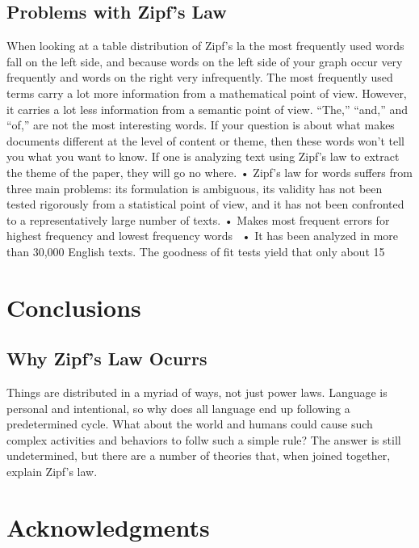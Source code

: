 \documentclass[a4paper,10pt]{article}
\begin{document}
\subsection{Problems with Zipf's Law}

When looking at a table distribution of Zipf’s la the most frequently used words fall on the left side, and because words on the left side of your graph occur very frequently and words on the right very infrequently. The most frequently used terms carry a lot more information from a mathematical point of view. However, it carries a lot less information from a semantic point of view. “The,” “and,” and “of,” are not the most interesting words. If your question is about what makes documents different at the level of content or theme, then these words won’t tell you what you want to know. If one is analyzing text using Zipf’s law to extract the theme of the paper, they will go no where. 
• Zipf's law for words suffers from three main problems: its formulation is ambiguous, its validity has not been tested rigorously from a statistical point of view, and it has not been confronted to a representatively large number of texts.
• Makes most frequent errors for highest frequency and lowest frequency words 
• It has been analyzed in more than 30,000 English texts. The goodness of fit tests yield that only about 15%


\section{Conclusions}


\subsection{Why Zipf's Law Ocurrs}

Things are distributed in a myriad of ways, not just power laws. Language is personal and intentional, so why does all language end up following a predetermined cycle. What about the world and humans could cause such complex activities and behaviors to follw such a simple rule? The answer is still undetermined, but there are a number of theories that, when joined together, explain Zipf's law.  


\section*{Acknowledgments}
\end{document}

